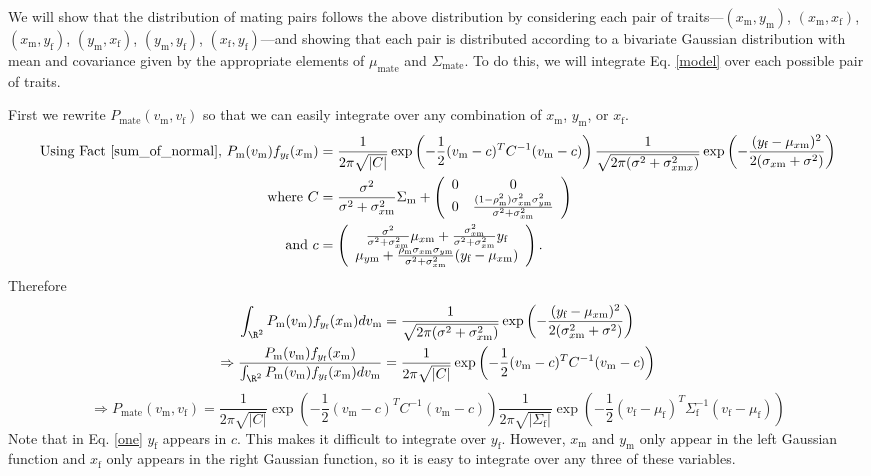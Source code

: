 \documentclass{article}
\newcommand{\x}[1]{\text{#1}}
\begin{document}
\begin{pf}
We will show that the distribution of mating pairs follows the above distribution by considering each pair of traits---$(x_\x{m},y_\x{m})$, $(x_\x{m},x_\x{f})$, $(x_\x{m},y_\x{f})$, $(y_\x{m},x_\x{f})$, $(y_\x{m},y_\x{f})$, $(x_\x{f},y_\x{f})$---and showing that each pair is distributed according to a bivariate Gaussian distribution with mean and covariance given by the appropriate elements of $\mu_\text{mate}$ and $\Sigma_\text{mate}$. To do this, we will integrate Eq. \ref{model} over each possible pair of traits.

First we rewrite $P_\x{mate}(v_\x{m},v_\x{f})$ so that we can easily integrate over any combination of $x_\x{m}$, $y_\x{m}$, or $x_\x{f}$.
\begin{align}
\text{Using Fact \ref{sum_of_normal}, }  P_\x{m}(v_\x{m})f_{y_\x{f}}(x_\x{m})&=\frac{1}{2\pi\sqrt{|C|}}\exp\left(-\frac{1}{2}(v_\x{m}-c)^TC^{-1}(v_\x{m}-c)\right)\frac{1}{\sqrt{2\pi(\sigma^2+\sigma_{x\x{m}x}^2)}}\exp\left(-\frac{(y_\x{f}-\mu_{x\x{m}})^2}{2(\sigma_{x\x{m}}+\sigma^2)}\right) \notag
\\ \text{ where } C&=\frac{\sigma^2}{\sigma^2+\sigma_{x\x{m}}^2}\Sigma_\x{m}+\left(\begin{array}{cc} 0 & 0 \\ 0 & \frac{(1-\rho_\x{m}^2)\sigma_{x\x{m}}^2\sigma_{y\x{m}}^2}{\sigma^2+\sigma_{x\x{m}}^2}\end{array}\right)  \label{C}
\\ \text{ and } c&= \left(\begin{array}{cc}\frac{\sigma^2}{\sigma^2+\sigma_{x\x{m}}^2}\mu_{x\x{m}}+\frac{\sigma_{x\x{m}}^2}{\sigma^2+\sigma_{x\x{m}}^2}y_\x{f}  
\\ \mu_{y\x{m}}+\frac{\rho_\x{m}\sigma_{x\x{m}}\sigma_{y\x{m}}}{\sigma^2+\sigma_{x\x{m}}^2}(y_\x{f}-\mu_{x\x{m}}) \end{array}\right).  \notag
\end{align}
Therefore 
\begin{align}
\int_{\R^2}P_\x{m}(v_\x{m})f_{y_\x{f}}(x_\x{m})dv_\x{m}&=\frac{1}{\sqrt{2\pi(\sigma^2+\sigma_{x\x{m}}^2)}}\exp\left(-\frac{(y_\x{f}-\mu_{x\x{m}})^2}{2(\sigma_{x\x{m}}^2+\sigma^2)}\right) \label{Z}
\\ \Rightarrow \frac{P_\x{m}(v_\x{m})f_{y_\x{f}}(x_\x{m})}{\int_{\R^2} P_\x{m}(v_\x{m})f_{y_\x{f}}(x_\x{m})dv_\x{m} }&=\frac{1}{2\pi\sqrt{|C|}}\exp\left(-\frac{1}{2}(v_\x{m}-c)^TC^{-1}(v_\x{m}-c)\right) \notag
\end{align}
\begin{equation} \label{one}
\Rightarrow P_\x{mate}(v_\x{m},v_\x{f})=\frac{1}{2\pi\sqrt{|C|}}\exp\left(-\frac{1}{2}(v_\x{m}-c)^TC^{-1}(v_\x{m}-c)\right)\frac{1}{2\pi\sqrt{|\Sigma_\x{f}|}}\exp\left(-\frac{1}{2}(v_\x{f}-\mu_\x{f})^T\Sigma_\x{f}^{-1}(v_\x{f}-\mu_\x{f})\right)
\end{equation}
Note that in Eq. \ref{one} $y_\x{f}$ appears in $c$. This makes it difficult to integrate over $y_\x{f}$. However, $x_\x{m}$ and $y_\x{m}$ only appear in the left Gaussian function and $x_\x{f}$ only appears in the right Gaussian function, so it is easy to integrate over any three of these variables.


\end{pf}
\end{document}
